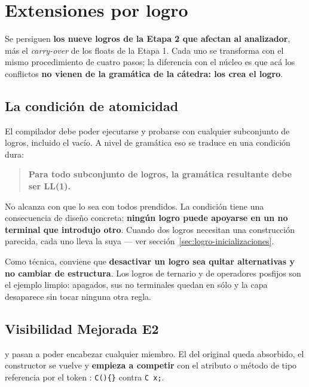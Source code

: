 \section{Extensiones por logro}
\label{sec:logros}

Se persiguen \textbf{los nueve logros de la Etapa 2 que afectan al analizador}, más el
\emph{carry-over} de los floats de la Etapa 1. Cada uno se transforma con el mismo procedimiento
de cuatro pasos; la diferencia con el núcleo es que acá los conflictos \textbf{no vienen de la
gramática de la cátedra: los crea el logro}.

\subsection{La condición de atomicidad}
\label{sec:atomicidad}

El compilador debe poder ejecutarse y probarse con cualquier subconjunto de logros, incluido el
vacío. A nivel de gramática eso se traduce en una condición dura:

\begin{quote}
\textbf{Para todo subconjunto de logros, la gramática resultante debe ser LL(1).}
\end{quote}

No alcanza con que lo sea con todos prendidos. La condición tiene una consecuencia de diseño
concreta: \textbf{ningún logro puede apoyarse en un no terminal que introdujo otro}. Cuando dos
logros necesitan una construcción parecida, cada uno lleva la suya --- ver
sección~\ref{sec:logro-inicializaciones}.

Como técnica, conviene que \textbf{desactivar un logro sea quitar alternativas y no cambiar de
estructura}. Los logros de ternario y de operadores posfijos son el ejemplo limpio: apagados,
sus no terminales quedan en sólo \eps{} y la capa desaparece sin tocar ninguna otra regla.

\subsection{Visibilidad Mejorada E2}
\label{sec:logro-visibilidad}

  y  pasan a poder encabezar cualquier miembro. El
 del  original queda absorbido, el constructor se vuelve 
 y \textbf{empieza a competir} con el atributo o método de tipo referencia por
el token : \texttt{C()\{\}} contra \texttt{C x;}.

